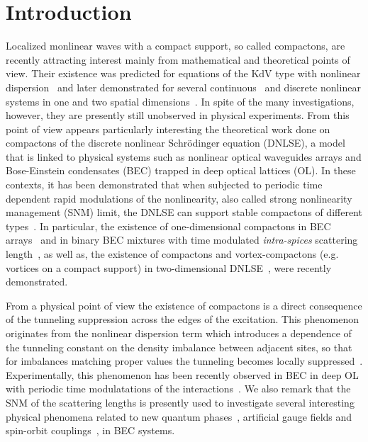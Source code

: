 \documentclass[12pt]{iopart}
\begin{document}
\maketitle


\section{Introduction}

Localized monlinear waves with a compact support, so called compactons, are recently attracting interest mainly from mathematical and theoretical points of view. Their existence was
predicted for equations of the KdV type with nonlinear
dispersion~\cite{Rosenau1} and later demonstrated for several continuous~\cite{Rosenau2} and discrete nonlinear systems in one and two spatial
dimensions~\cite{Pikovsky,Johansson}. In spite of the many
investigations, however, they  are presently still unobserved in
physical experiments. From this point of view appears particularly interesting
the theoretical work done on compactons of the discrete nonlinear Schr\"odinger
equation (DNLSE), a model that is linked to physical
systems such as nonlinear optical waveguides arrays and Bose-Einstein
condensates (BEC) trapped in deep optical lattices (OL). In these contexts,
it has been demonstrated that when subjected to periodic time dependent rapid modulations
of the nonlinearity, also called strong
nonlinearity management (SNM) limit, the DNLSE can support stable compactons of different
types~\cite{AKS,AHSU,DSKA}. In particular, the existence of one-dimensional compactons
in BEC arrays~\cite{AKS} and in binary BEC mixtures with time modulated
{\it intra-spices} scattering length~\cite{AHSU}, as well as, the existence of compactons and vortex-compactons (e.g. vortices on a compact support)  in two-dimensional DNLSE~\cite{DSKA}, were recently demonstrated.

From a physical point of view the existence of compactons is a direct
consequence of the tunneling suppression across the edges of the excitation.
This phenomenon originates from the  nonlinear
dispersion term  which introduces a dependence of
the  tunneling  constant on the density  imbalance  between
adjacent sites, so that for imbalances matching  proper values the
tunneling becomes locally suppressed~\cite{AK,GMH}.
Experimentally, this phenomenon  has been recently observed in BEC in deep OL with periodic time modulatations of the interactions~\cite{Meinert}. We also remark that the SNM  of the scattering lengths is presently  used  to investigate several interesting physical phenomena related to new quantum phases~\cite{Greschner,Akos}, artificial
gauge fields and spin-orbit couplings~\cite{Wang,GSP}, in BEC systems.
\end{document}
